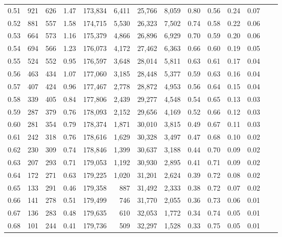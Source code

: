 \begin{tabular}{rrrrrrrrrrrrrr}
0.51 &    921 &  626 &    1.47 &  173,834 &    6,411 &  25,766 &   8,059 &  0.80 &  0.56 &  0.24 &      0.07 \\
0.52 &    881 &  557 &    1.58 &  174,715 &    5,530 &  26,323 &   7,502 &  0.74 &  0.58 &  0.22 &      0.06 \\
0.53 &    664 &  573 &    1.16 &  175,379 &    4,866 &  26,896 &   6,929 &  0.70 &  0.59 &  0.20 &      0.06 \\
0.54 &    694 &  566 &    1.23 &  176,073 &    4,172 &  27,462 &   6,363 &  0.66 &  0.60 &  0.19 &      0.05 \\
0.55 &    524 &  552 &    0.95 &  176,597 &    3,648 &  28,014 &   5,811 &  0.63 &  0.61 &  0.17 &      0.04 \\
0.56 &    463 &  434 &    1.07 &  177,060 &    3,185 &  28,448 &   5,377 &  0.59 &  0.63 &  0.16 &      0.04 \\
0.57 &    407 &  424 &    0.96 &  177,467 &    2,778 &  28,872 &   4,953 &  0.56 &  0.64 &  0.15 &      0.04 \\
0.58 &    339 &  405 &    0.84 &  177,806 &    2,439 &  29,277 &   4,548 &  0.54 &  0.65 &  0.13 &      0.03 \\
0.59 &    287 &  379 &    0.76 &  178,093 &    2,152 &  29,656 &   4,169 &  0.52 &  0.66 &  0.12 &      0.03 \\
0.60 &    281 &  354 &    0.79 &  178,374 &    1,871 &  30,010 &   3,815 &  0.49 &  0.67 &  0.11 &      0.03 \\
0.61 &    242 &  318 &    0.76 &  178,616 &    1,629 &  30,328 &   3,497 &  0.47 &  0.68 &  0.10 &      0.02 \\
0.62 &    230 &  309 &    0.74 &  178,846 &    1,399 &  30,637 &   3,188 &  0.44 &  0.70 &  0.09 &      0.02 \\
0.63 &    207 &  293 &    0.71 &  179,053 &    1,192 &  30,930 &   2,895 &  0.41 &  0.71 &  0.09 &      0.02 \\
0.64 &    172 &  271 &    0.63 &  179,225 &    1,020 &  31,201 &   2,624 &  0.39 &  0.72 &  0.08 &      0.02 \\
0.65 &    133 &  291 &    0.46 &  179,358 &      887 &  31,492 &   2,333 &  0.38 &  0.72 &  0.07 &      0.02 \\
0.66 &    141 &  278 &    0.51 &  179,499 &      746 &  31,770 &   2,055 &  0.36 &  0.73 &  0.06 &      0.01 \\
0.67 &    136 &  283 &    0.48 &  179,635 &      610 &  32,053 &   1,772 &  0.34 &  0.74 &  0.05 &      0.01 \\
0.68 &    101 &  244 &    0.41 &  179,736 &      509 &  32,297 &   1,528 &  0.33 &  0.75 &  0.05 &      0.01 \\

\end{tabular}
